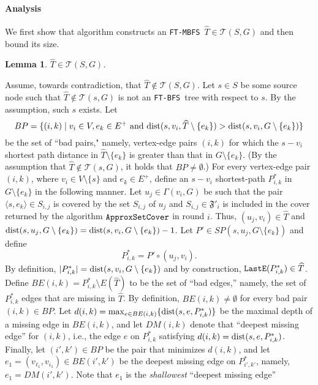\documentclass[12pt]{article}
\newtheorem{lemma}[theorem]{Lemma}
\def\Set{\mathfrak{F}}
\newcommand{\dist}{\mbox{\rm dist}}
\def\Proof{\par\noindent{\bf Proof:~}}
\def\LastE{\mbox{\tt LastE}}
\def\FTMBFS{\mbox{\tt FT-MBFS}}
\def\FTBFS{\mbox{\tt FT-BFS}}
\def\ApproxSetCover{\mbox{\tt ApproxSetCover}}
\begin{document}
\paragraph{Analysis}
We first show that algorithm constructs an \FTMBFS\
$\widehat{T} \in \mathcal{T}(S,G)$ and then bound its size.
\begin{lemma}
\label{lem:correct}
$\widehat{T} \in \mathcal{T}(S,G)$.
\end{lemma}
\Proof
Assume, towards contradiction, that $\widehat{T} \notin \mathcal{T}(S,G)$.
Let $s \in S$ be some source node such that $\widehat{T} \notin \mathcal{T}(s,G)$ is not an \FTBFS\ tree with respect to $s$. By the assumption, such $s$ exists. Let
$$BP=\{(i,k) \mid v_i \in V, e_k \in E^{+} \mbox{~and~}
\dist(s,v_i, \widehat{T} \setminus \{e_k\}) >  \dist(s,v_i,G \setminus \{e_k\})\}$$
be the set of ``bad pairs," namely, vertex-edge pairs $(i,k)$ for which the $s-v_i$ shortest path distance in $\widehat{T} \setminus \{e_k\}$ is greater than that in $G\setminus \{e_k\}$.
(By the assumption that $\widehat{T} \notin \mathcal{T}(s,G)$, it holds that $BP\ne \emptyset$.)
For every vertex-edge pair $(i,k)$, where $v_i \in V \setminus \{s\}$ and $e_k \in E^{+}$,
define an $s-v_i$ shortest-path $P^*_{i,k}$ in $G \setminus \{e_k\}$ in the following manner.
Let $u_j \in \Gamma(v_i, G)$ be such that the pair $\langle s, e_k \rangle \in S_{i,j}$
is covered by the set $S_{i,j}$ of $u_j$ and $S_{i,j} \in \Set'_i$ is included in the cover returned by the algorithm $\ApproxSetCover$ in round $i$. Thus, $(u_j,v_i)\in \widehat{T}$ and
$\dist(s, u_j, G \setminus \{e_k\})=\dist(s, v_i, G \setminus \{e_k\})-1$.
Let $P' \in SP(s, u_j, G \setminus \{e_k\})$ and define
$$P^*_{i,k}=P' \circ (u_j,v_i).$$
By definition, $|P^*_{i,k}|=\dist(s, v_i, G \setminus \{e_k\})$ and by construction, $\LastE(P^*_{i,k}) \in \widehat{T}$.
Define
$BE(i,k)=P^{*}_{i,k} \setminus E(\widehat{T})$ to be the set of ``bad edges,''
namely, the set of $P^{*}_{i,k}$ edges that are missing in $\widehat{T}$.
By definition, $BE(i,k) \neq \emptyset$ for every bad pair $(i,k) \in BP$.
Let $d(i,k)=\max_{e \in BE(i,k)}\{\dist(s,e,P^{*}_{i,k})\}$ be the maximal depth
of a missing edge in $BE(i,k)$, and let $DM(i,k)$ denote that ``deepest
missing edge'' for $(i,k)$, i.e., the edge $e$ on $P^{*}_{i,k}$ satisfying
$d(i,k) = \dist(s,e,P^{*}_{i,k})$.
Finally, let $(i',k') \in BP$ be the pair that minimizes $d(i,k)$,
and let $e_1=(v_{\ell_1}, v_{i_1}) \in BE(i',k')$ be
the deepest missing edge on $P^{*}_{i',k'}$, namely, $e_1=DM(i',k')$.
Note that $e_1$ is the {\em shallowest} ``deepest missing edge''
\end{document}
